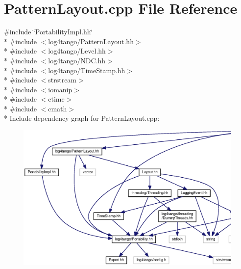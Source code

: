 \section{Pattern\-Layout.\-cpp File Reference}
\label{PatternLayout_8cpp}
{\ttfamily \#include \char`\"{}Portability\-Impl.\-hh\char`\"{}}\\*
{\ttfamily \#include $<$log4tango/\-Pattern\-Layout.\-hh$>$}\\*
{\ttfamily \#include $<$log4tango/\-Level.\-hh$>$}\\*
{\ttfamily \#include $<$log4tango/\-N\-D\-C.\-hh$>$}\\*
{\ttfamily \#include $<$log4tango/\-Time\-Stamp.\-hh$>$}\\*
{\ttfamily \#include $<$strstream$>$}\\*
{\ttfamily \#include $<$iomanip$>$}\\*
{\ttfamily \#include $<$ctime$>$}\\*
{\ttfamily \#include $<$cmath$>$}\\*
Include dependency graph for Pattern\-Layout.\-cpp\-:
\nopagebreak
\begin{figure}[H]
\begin{center}
\leavevmode
\includegraphics[width=350pt]{d6/ded/PatternLayout_8cpp__incl}
\end{center}
\end{figure}
